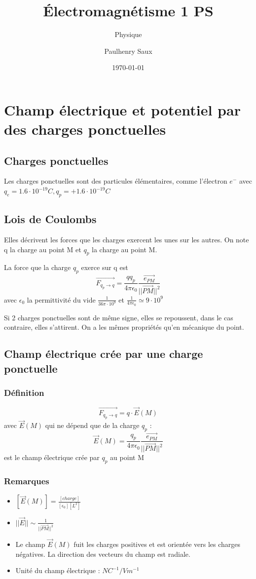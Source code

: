 \documentclass[french]{yLectureNote}
\title{Électromagnétisme 1 PS}
\subtitle{Physique}
\author{Paulhenry Saux}
\date{\today}
\renewcommand{\vec}{\overrightarrow}
\newcommand{\norm}[1]{||\vec{#1}||}
\newcommand{\E}{\vec{E}(M)}
\begin{document}
\chapter{Champ électrique et potentiel par des charges ponctuelles}
\section{Charges ponctuelles}
\begin{definition}
Les charges ponctuelles sont des particules élémentaires, comme l'électron \(e^-\) avec \(q_e = 1.6\cdot 10^{-19}C, q_p = + 1.6\cdot 10^{-19}C\)
\end{definition}
\section{Lois de Coulombs}
Elles décrivent les forces que les charges exercent les unes sur les autres. On note q la charge au point M et \(q_p\) la charge au point M.
\begin{theorem}
La force que la charge \(q_p\) exerce sur q est \[\vec{F_{q_p\to q}} = \frac{qq_p}{4\pi \epsilon_0}\frac{\vec{e_{PM}}}{\norm{PM}^2}\] avec \(\epsilon_0\) la permittivité du vide \(\frac{1}{36\pi \cdot 10^{9}}\) et \(\frac{1}{4\pi \epsilon_0}\simeq 9\cdot 10^{9}\)
\end{theorem}

Si 2 charges ponctuelles sont de m\^eme signe, elles se repoussent, dans le cas contraire, elles s'attirent. On a les m\^emes propriétés qu'en mécanique du point.
\section{Champ électrique crée par une charge ponctuelle}
\subsection{Définition}
\begin{definition}
\[\vec{F_{q_p\to q}} = q \cdot \E\] avec \(\E\) qui ne dépend que de la charge \(q_p\) : \[\E = \frac{q_p}{4\pi\epsilon_0}\frac{\vec{e_{PM}}}{\norm{PM}^2}\] est le champ électrique crée par \(q_p\) au point M
\end{definition}
\subsection{Remarques}
\begin{itemize}
 \item \([\E] = \frac{[charge]}{[\epsilon_0][L^2]}\)
 \item \(\norm{E} \sim \frac{1}{\norm{PM}^2}\)
 \item Le champ \(\E\) fuit les charges positives et est orientée vers les charges négatives. La direction des vecteurs du champ est radiale.
 \item Unité du champ électrique : \(NC^{-1} / Vm^{-1}\)
\end{itemize}
\end{document}
